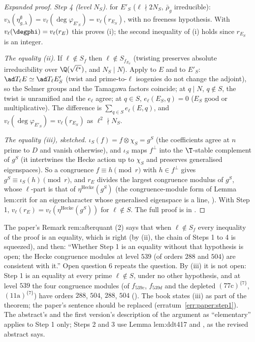 \begin{sloppypar}
\begin{proof}[Expanded proof]
\emph{Step 4 (level $N_S$).}  for $E'_S$ ($\ell\nmid2N_S$, $\bar\rho_g$ irreducible): $v_\lambda(\eta^\emptyset_{g,\lambda})=v_\ell(\deg\varphi_{E'_S})=v_\ell(r_{E_S})$, with no freeness hypothesis. With
$v_\ell(\degphi)=v_\ell(r_E)$ this proves (i); the second inequality of (i) holds since $r_{E_S}$ is an integer.

\emph{The equality (ii).} If $\ell\notin S_f$ then $\ell\notin S_{f_{E_S}}$ (twisting preserves absolute irreducibility over $\Q(\sqrt{\ell^*})$, and $N_S\mid N$). Apply  to $E$ and to $E'_S$:
$\ad T_\ell E\simeq\ad T_\ell E'_S$ (twist and prime-to-$\ell$ isogenies do not change the adjoint), so the Selmer groups and the Tamagawa factors coincide; at $q\mid N$, $q\notin S$, the twist is
unramified and the $e_\ell$ agree; at $q\in S$, $e_\ell(E_S,q)=0$ ($E_S$ good or multiplicative). The difference is $\sum_{q\in S}e_\ell(E,q)$, and $v_\ell(\deg\varphi_{E'_S})=v_\ell(r_{E_S})$ as $\ell^2\nmid N_S$.

\emph{The equality (iii), sketched.} $\iota_S(f)=f\otimes\chi_S=g^S$ (the coefficients agree at $n$ prime to $D$ and vanish otherwise), and $\iota_S$ maps $f^\perp$ into the $\T$-stable complement
of $g^S$ (it intertwines the Hecke action up to $\chi_S$ and preserves generalised eigenspaces). So a congruence $f\equiv h\pmod r$ with $h\in f^\perp$ gives $g^S\equiv\iota_S(h)\pmod r$, and $r_E$
divides the largest congruence modulus of $g^S$, whose $\ell$-part is that of $\eta^{\mathrm{Hecke}}(g^S)$ (the congruence-module form of Lemma lem:crit for an eigencharacter whose generalised
eigenspace is a line, ). With Step 1, $v_\ell(r_E)=v_\ell(\eta^{\mathrm{Hecke}}(g^S))$ for $\ell\notin S$. The full proof is in .
\end{proof}

\begin{warning}\label{warn:paper:step1}
The paper's Remark rem:afterquant (2) says that when $\ell\notin S_f$ every inequality of the proof is an equality, which is right (by (ii), the chain of Steps 1 to 4 is squeezed),
and then: ``Whether Step 1 is an equality without that hypothesis is open; the Hecke congruence modules at level $539$ (of orders $288$ and $504$) are consistent with it.''
Open question 6 repeats the question. By (iii) it is not open: Step 1 is an equality at every prime $\ell\notin S$, under no other hypothesis, and at level $539$ the four
congruence modules (of $f_{539c}$, $f_{539d}$ and the depleted $(77\mathrm c)^{\{7\}}$, $(11\mathrm a)^{\{7\}}$) have orders $288$, $504$, $288$, $504$ (). The book states (iii) as part of
the theorem; the paper's sentence should be replaced (erratum~\ref{err:paper:step1}). The abstract's and the first version's description of the argument as ``elementary'' applies
to Step 1 only; Steps 2 and 3 use Lemma lem:ddt417 and \cite[Proposition 1.4(c)]{DFG04}, as the revised abstract says.
\end{warning}


\end{sloppypar}
